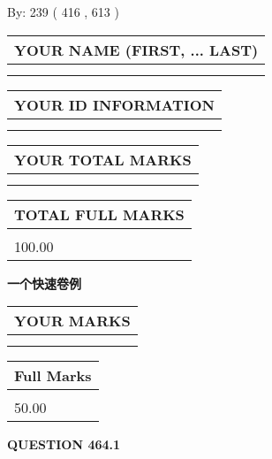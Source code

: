 \documentclass{ctexart}
\begin{document}
   
\hspace{1.0in} By: 
 239 ( 416 ,  613 )
   
   
   
   
\newpage 
\setcounter{page}{ 
   464001 } 
   
   
   
   
\noindent\begin{tabular}{|l|}
\hline
YOUR NAME (FIRST, ... LAST)  \\
\hline
 \\ 
 \\ 
\hline
\end{tabular}
\hspace{0.05in} \begin{tabular}{|l|}
\hline
 YOUR   ID   INFORMATION  \\
\hline
 \\ 
 \\ 
\hline
\end{tabular}
   
   
\vspace{0.2in}\noindent\begin{tabular}{|l|}
\hline
YOUR TOTAL MARKS  \\
\hline
 \\ 
 \\ 
\hline
\end{tabular}
\hspace{0.05in} \begin{tabular}{|l|}
\hline
TOTAL FULL MARKS  \\
\hline
 \\ 
100.00 \\
\hline
\end{tabular}
   
   
 \vspace{0.2in}
{\LARGE {\textbf{ 一个快速卷例}}}
   
   
  
\vspace{0.2in}
  
\noindent\begin{tabular}{|l|}
\hline
 YOUR MARKS  \\
\hline
 \\ 
 \\ 
\hline
\end{tabular}
\hspace{0.05in} \begin{tabular}{|l|}
\hline
 Full Marks  \\
\hline
 \\ 
50.00 \\
\hline
\end{tabular}
{\textbf{\Large{QUESTION
464.1 
}}}
  
\end{document}
